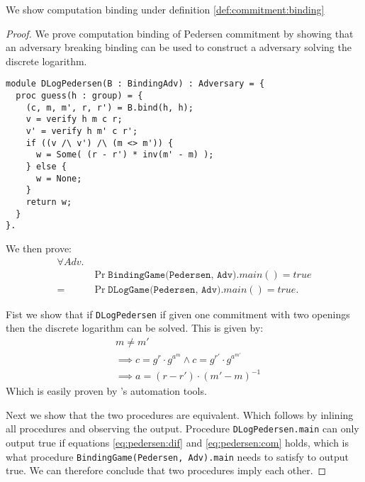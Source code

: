 \begin{lemma}
  We show computation binding under definition \ref{def:commitment:binding}
\end{lemma}
\begin{proof}
  We prove computation binding of Pedersen commitment by showing that an
  adversary breaking binding can be used to construct a adversary solving the discrete logarithm.

\begin{lstlisting}
module DLogPedersen(B : BindingAdv) : Adversary = {
  proc guess(h : group) = {
    (c, m, m', r, r') = B.bind(h, h);
    v = verify h m c r;
    v' = verify h m' c r';
    if ((v /\ v') /\ (m <> m')) {
      w = Some( (r - r') * inv(m' - m) );
    } else {
      w = None;
    }
    return w;
  }
}.
\end{lstlisting}

  We then prove:
  \begin{align*}
    \forall Adv.& \\
    &\Pr{\texttt{BindingGame(Pedersen, Adv)}.main() = true} \\
    = &\Pr{\texttt{DLogGame(Pedersen, Adv)}.main() = true}.
  \end{align*}

  Fist we show that if \texttt{DLogPedersen} if given one commitment with two
  openings then the discrete logarithm can be solved. This is given by:
  \begin{align}
    &m \neq m' \label{eq:pedersen:dif}\\
    &\implies c = g^{r} \cdot g^{a^{m}} \land c = g^{r'} \cdot g^{a^{m'}} \label{eq:pedersen:com}\\
    &\implies a = (r - r') \cdot (m' - m)^{-1}
  \end{align}
  Which is easily proven by \easycrypt's automation tools.

  Next we show that the two procedures are equivalent. Which follows by inlining
  all procedures and observing the output.
  Procedure \texttt{DLogPedersen.main} can only output true if equations
  \ref{eq:pedersen:dif} and \ref{eq:pedersen:com} holds, which is what procedure
  \texttt{BindingGame(Pedersen, Adv).main} needs to satisfy to output true. We
  can therefore conclude that two procedures imply each other.
\end{proof}

